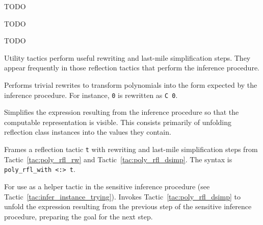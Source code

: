 \label{sec:univariate}


TODO


TODO


TODO

\label{sec:tactics}


Utility tactics perform useful rewriting and last-mile simplification steps. They appear frequently in those reflection tactics that perform the inference procedure.

\begin{tactic}
\label{tac:poly_rfl_rw}
\leanok
Performs trivial rewrites to transform polynomials into the form expected by the inference procedure. For instance, \lstinline{0} is rewritten as \lstinline{C 0}.
\end{tactic}

\begin{tactic}
\label{tac:poly_rfl_dsimp}
\leanok
Simplifies the expression resulting from the inference procedure so that the computable representation is visible. This consists primarily of unfolding reflection class instances into the values they contain.
\end{tactic}

\begin{tactic}
\label{tac:poly_rfl_with}
\leanok
{}
Frames a reflection tactic \lstinline{t} with rewriting and last-mile simplification steps from Tactic~\ref{tac:poly_rfl_rw} and Tactic~\ref{tac:poly_rfl_dsimp}. The syntax is \lstinline{poly_rfl_with <:> t}.
\end{tactic}

\begin{tactic}
\label{tac:poly_infer_try}
\leanok
{}
For use as a helper tactic in the sensitive inference procedure (see Tactic~\ref{tac:infer_instance_trying}). Invokes Tactic~\ref{tac:poly_rfl_dsimp} to unfold the expression resulting from the previous step of the sensitive inference procedure, preparing the goal for the next step.
\end{tactic}

